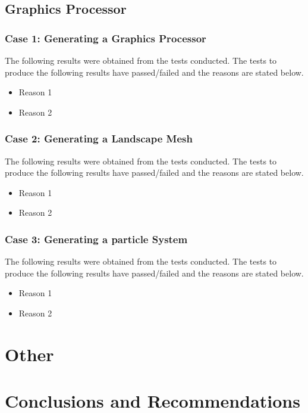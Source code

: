 \documentclass[11pt]{article}
\begin{document}
\subsection{Graphics Processor}
\subsubsection{Case 1: Generating a Graphics Processor}
The following results were obtained from the tests conducted. The tests to produce the
following results have passed/failed and the reasons are stated below.

\begin{itemize}
	\item Reason 1
	\item Reason 2
\end{itemize}

\subsubsection{Case 2: Generating a Landscape Mesh}
The following results were obtained from the tests conducted. The tests to produce the
following results have passed/failed and the reasons are stated below.

\begin{itemize}
	\item Reason 1
	\item Reason 2
\end{itemize}

\subsubsection{Case 3: Generating a particle System}
The following results were obtained from the tests conducted. The tests to produce the
following results have passed/failed and the reasons are stated below.

\begin{itemize}
	\item Reason 1
	\item Reason 2
\end{itemize}

\section{Other}

\section{Conclusions and Recommendations}
\end{document}
